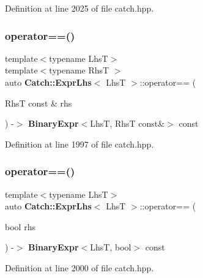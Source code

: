 Definition at line 2025 of file catch.\+hpp.

\mbox{\label{class_catch_1_1_expr_lhs_af218aaf7b5b0a0ebb6b3697f2c89893d}} 
\subsubsection{operator==()\hspace{0.1cm}{\footnotesize\ttfamily [1/2]}}
{\footnotesize\ttfamily template$<$typename LhsT$>$ \\
template$<$typename RhsT $>$ \\
auto \textbf{ Catch\+::\+Expr\+Lhs}$<$ LhsT $>$\+::operator== (\begin{DoxyParamCaption}\item[{RhsT const \&}]{rhs }\end{DoxyParamCaption}) -\/$>$ \textbf{ Binary\+Expr}$<$LhsT, RhsT const\&$>$ const \hspace{0.3cm}{\ttfamily [inline]}}



Definition at line 1997 of file catch.\+hpp.

\mbox{\label{class_catch_1_1_expr_lhs_ab707a84abdffbdc35962a495e238d393}} 
\subsubsection{operator==()\hspace{0.1cm}{\footnotesize\ttfamily [2/2]}}
{\footnotesize\ttfamily template$<$typename LhsT$>$ \\
auto \textbf{ Catch\+::\+Expr\+Lhs}$<$ LhsT $>$\+::operator== (\begin{DoxyParamCaption}\item[{bool}]{rhs }\end{DoxyParamCaption}) -\/$>$ \textbf{ Binary\+Expr}$<$LhsT, bool$>$ const \hspace{0.3cm}{\ttfamily [inline]}}



Definition at line 2000 of file catch.\+hpp.

\mbox{\label{class_catch_1_1_expr_lhs_ae9b4ee923b90af22c9e39261c2f03cd3}} 
